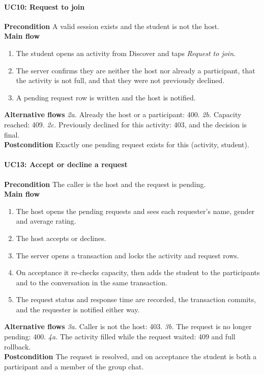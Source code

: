 \documentclass{tietreport}
\begin{document}
\paragraph{UC10: Request to join}
\textbf{Precondition} A valid session exists and the student is not the host.\\
\textbf{Main flow}
\begin{enumerate}[nosep]
  \item The student opens an activity from Discover and taps \emph{Request to join}.
  \item The server confirms they are neither the host nor already a participant, that
        the activity is not full, and that they were not previously declined.
  \item A pending request row is written and the host is notified.
\end{enumerate}
\textbf{Alternative flows} \emph{2a.} Already the host or a participant: 400.
\emph{2b.} Capacity reached: 409. \emph{2c.} Previously declined for this activity: 403,
and the decision is final.\\
\textbf{Postcondition} Exactly one pending request exists for this (activity, student).

\paragraph{UC13: Accept or decline a request}
\textbf{Precondition} The caller is the host and the request is pending.\\
\textbf{Main flow}
\begin{enumerate}[nosep]
  \item The host opens the pending requests and sees each requester's name, gender and
        average rating.
  \item The host accepts or declines.
  \item The server opens a transaction and locks the activity and request rows.
  \item On acceptance it re-checks capacity, then adds the student to the participants
        and to the conversation in the same transaction.
  \item The request status and response time are recorded, the transaction commits, and
        the requester is notified either way.
\end{enumerate}
\textbf{Alternative flows} \emph{3a.} Caller is not the host: 403. \emph{3b.} The request
is no longer pending: 400. \emph{4a.} The activity filled while the request waited: 409
and full rollback.\\
\textbf{Postcondition} The request is resolved, and on acceptance the student is both a
participant and a member of the group chat.
\end{document}
